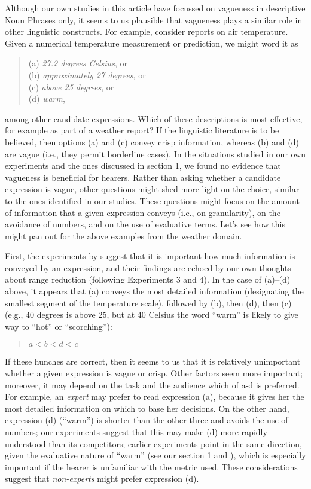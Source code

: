 Although our own studies in this article have focussed on vagueness in descriptive Noun Phrases only, it seems to us plausible that vagueness plays a similar role in other
linguistic constructs. For example, consider reports on air temperature. Given a numerical
temperature measurement or prediction, we might word it as 
%
\begin{quote}
(a) {\em 27.2 degrees Celsius}, or\\
(b) {\em approximately 27 degrees}, or\\
(c) {\em above 25 degrees}, or\\
(d) {\em warm}, 
\end{quote}
%
among other candidate expressions. Which of these descriptions is most effective, for example as part of a weather report? If the linguistic literature is to be believed, then options (a) and (c) convey crisp information, whereas (b) and (d) are vague (i.e., they permit borderline cases). In the situations studied in our own experiments and the ones discussed in section 1, we found no evidence that vagueness is beneficial for hearers. Rather than asking whether a candidate expression is vague, other questions might shed more light on the choice, similar to the ones identified in our studies. These questions might focus on the amount of information that a given expression conveys (i.e., on granularity), on the avoidance of numbers, and on the use of evaluative terms. Let's see how this might pan out for the above examples from the weather domain.

First, the experiments by \citeauthor{Mishra01042011} suggest that it is important how much information is conveyed by an expression, and their findings are echoed by our own thoughts about range reduction (following Experiments 3 and 4). In the case of (a)--(d) above, it appears that (a) conveys the most detailed information (designating the smallest segment of the temperature scale), followed by (b), then (d), then (c) (e.g., 40 degrees is above 25, but at 40 Celsius the word ``warm'' is likely to give way to ``hot'' or ``scorching''): 
%
\begin{quote}
$a < b < d < c$
\end{quote}
%
If these hunches are correct, then it seems to us that it is relatively unimportant whether a given expression is vague or crisp. Other factors seem more important; moreover, it may depend on the task and the audience which of a-d is preferred. For example, an \emph{expert} may prefer to read expression (a), because it gives her the most detailed information on which to base her decisions. On the other hand, expression (d) (``warm'') is shorter than the other three and avoids the use of numbers; our experiments suggest that this may make (d) more rapidly understood than its competitors; earlier experiments point in the same direction, given the evaluative nature of ``warm'' (see our section 1 and  \citeauthor{peters2009bringing}), which is especially important if the hearer is unfamiliar with the metric used. These considerations suggest that {\em non-experts} might prefer expression (d). 

